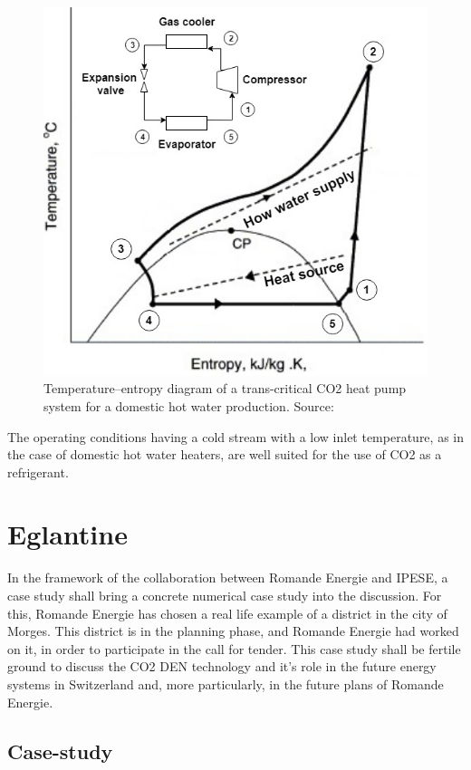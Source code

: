 \documentclass{article}
\begin{document}
\begin{figure}[h!]
\centering
\includegraphics[width=1\textwidth]{HP_cylce_CO2_schema.png}
\caption{Temperature–entropy diagram of a trans-critical CO2 heat pump system for a domestic hot water production. Source: \cite{kimPerformanceTranscriticalCO22005}}
\label{fig:hp_CO2}
\end{figure}

The operating conditions having a cold stream with a low inlet temperature, as in the case of domestic hot water heaters, are well suited for the use of CO2 as a refrigerant.

\section{Eglantine}
In the framework of the collaboration between Romande Energie and IPESE, a case study shall bring a concrete numerical case study into the discussion. For this, Romande Energie has chosen a real life example of a district in the city of Morges. This district is in the planning phase, and Romande Energie had worked on it, in order to participate in the call for tender. This case study shall be fertile ground to discuss the CO2 DEN technology and it's role in the future energy systems in Switzerland and, more particularly, in the future plans of Romande Energie.

\subsection{Case-study}
\end{document}
